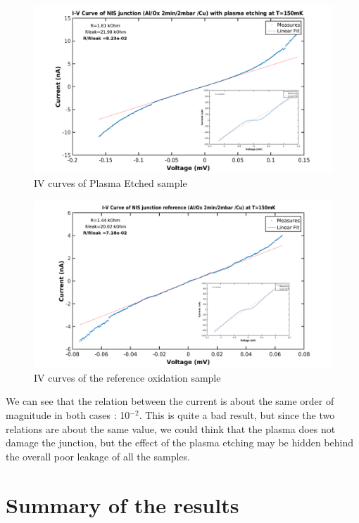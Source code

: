         \begin{figure}
            \centering
            \includegraphics[width=15cm]{PlasmaOx2.png}
            \caption{IV curves of Plasma Etched sample}
            \label{PlasmaOx}
        \end{figure}
           \begin{figure}
            \centering
            \includegraphics[width=15cm]{RegularOxRef2.png}
            \caption{IV curves of the reference oxidation sample}
            \label{ReferenceOx}
        \end{figure}
           
           We can see that the relation between the current is about the same order of magnitude in both cases : 10$^{-2}$. This is quite a bad result, but since the two relations are about the same value, we could think that the plasma does not damage the junction, but the effect of the plasma etching may be hidden behind the overall poor leakage of all the samples.
                
                \section{Summary of the results}
            
